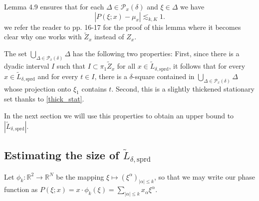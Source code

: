\documentclass[12pt]{article}
\newcommand{\R}{\mathbb{R}}
\theoremstyle{definition}
\theoremstyle{remark}
\numberwithin{equation}{section}
\begin{document}
Lemma 4.9 ensures that for each $\Delta\in\mathcal{P}_x (\delta)$ and $\xi\in\Delta$ we have
\begin{equation}\label{thick_stat}
|P(\xi;x)-\mu_x|\lesssim_{k,K} 1.
\end{equation}
we refer the reader to \cite{BGZZ} pp. 16-17 for the proof of this lemma where it becomes clear why one works with $\widetilde{Z}_x$ instead of $Z_x$. 

The set $\bigcup_{\Delta\in\mathcal{P}_x(\delta)}\Delta$ has the following two properties: First, since there is a dyadic interval $I$ such that $I\subset\pi_1 \widetilde{Z}_x$ for all $x\in\tilde{L}_{\delta,\mathrm{sprd}}$, it follows that for every $x\in\tilde{L}_{\delta,\mathrm{sprd}}$ and for every $t\in I$, there is a $\delta$-square contained in $\bigcup_{\Delta\in\mathcal{P}_x(\delta)}\Delta$ whose projection onto $\xi_1$ contains $t$. Second, this is a slightly thickened stationary set thanks to \eqref{thick_stat}.

In the next section we will use this properties to obtain an upper bound to $|\widetilde{L}_{\delta,\mathrm{sprd}}|$.

\subsection{Estimating the size of $\widetilde{L}_{\delta,\mathrm{sprd}}$}

Let $\phi_k : \R^2\to\R^N$ be the mapping $\xi\mapsto (\xi^\alpha)_{|\alpha|\leq k}$, so that we may write our phase function as $P(\xi;x)= x\cdot \phi_k(\xi) =\sum_{|\alpha|\leq k} x_\alpha \xi^\alpha$.
\end{document}
